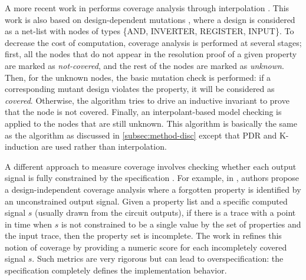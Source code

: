 A more recent work in \cite{chockler2010coverage} performs coverage analysis through interpolation \cite{mcmillan2003interpolation}. This work is also based on design-dependent mutations \cite{chockler_coverage_2003}, where a design is considered as a net-list with nodes of types \{AND, INVERTER, REGISTER, INPUT\}.
To decrease the cost of computation, coverage analysis is performed at several stages; first, all the nodes that do not appear in the resolution proof of a given property are marked as \emph{not-covered}, and the rest of the nodes are marked as \emph{unknown}. Then, for the unknown nodes, the basic mutation check is performed: if a corresponding mutant design violates the property, it will be considered as \emph{covered}. Otherwise, the algorithm tries to drive an inductive invariant to prove that the node is not covered. Finally, an interpolant-based model checking is applied to the nodes that are still unknown. This algorithm is basically the same as the \mustalg algorithm as discussed in \ref{subsec:method-disc} except that PDR and K-induction are used rather than interpolation.

A different approach to measure coverage involves checking whether each output signal is fully constrained by the specification \cite{das2005formal, claessen2007coverage, grosse2007estimating}. For example, in \cite{claessen2007coverage}, authors propose a design-independent coverage analysis where a forgotten property is identified by an unconstrained output signal. Given a property list and a specific computed signal $s$ (usually drawn from the circuit outputs), if there is a trace with a point in time when $s$ is not constrained to be a single value by the set of properties and the input trace, then the property set is incomplete. %
 The work in \cite{haedicke2012guiding} refines this notion of coverage by providing a numeric score for each incompletely covered signal $s$.  Such metrics are very rigorous but can lead to overspecification: the specification completely defines the implementation behavior.
 
